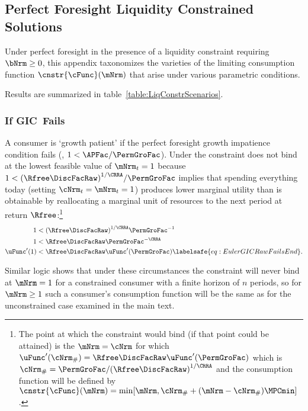 \documentclass[\econtexRoot/BufferStockTheory]{subfiles}
\begin{document}
\subsection{Perfect Foresight Liquidity Constrained Solutions}

Under perfect foresight in the presence of a liquidity constraint requiring $\bNrm \geq 0$, this appendix taxonomizes the varieties of the limiting consumption function $\cnstr{\cFunc}(\mNrm)$ that arise under various parametric conditions.



Results are summarized in table~\ref{table:LiqConstrScenarios}.

\subsubsection{If {GIC}~Fails}

A consumer is `growth patient' if the perfect foresight growth
impatience condition fails (\cncl{\GICRaw}, $1 < \APFac/\PermGroFac$).
Under
\cncl{\GICRaw} the constraint does not bind at the lowest feasible value of $\mNrm_{t}=1$ because
$1 < {(\Rfree\DiscFacRaw)}^{1/\CRRA}/\PermGroFac$ implies that spending
everything today (setting $\cNrm_{t}=\mNrm_{t}=1$) produces lower
marginal utility than is obtainable by reallocating a marginal unit of
resources to the next period at return $\Rfree$:\footnote{The point at
  which the constraint would bind (if that point could be attained) is
  the $\mNrm=\cNrm$ for which $\uFunc^{\prime}(\cNrm_{\#}) = \Rfree
  \DiscFacRaw \uFunc^{\prime}(\PermGroFac)$ which is $\cNrm_{\#} =
  \PermGroFac/{(\Rfree \DiscFacRaw)}^{1/\CRRA}$ and the consumption function
  will be defined by
  $\cnstr{\cFunc}(\mNrm)=\min[\mNrm,\cNrm_{\#}+(\mNrm-\cNrm_{\#})\MPCmin
  ]$.}
\begin{equation}\begin{gathered}\begin{aligned}
  1  & < {(\Rfree \DiscFacRaw)}^{1/\CRRA}\PermGroFac^{-1}    \notag
  \\ 1  & < \Rfree \DiscFacRaw \PermGroFac^{-\CRRA} \notag
  \\  \uFunc^{\prime}(1)  & < \Rfree \DiscFacRaw \uFunc^{\prime}(\PermGroFac)   \labelsafe{eq:EulerGICRawFailsEnd}.
\end{aligned}\end{gathered}\end{equation}

Similar logic shows that under these circumstances the constraint will never bind at $\mNrm=1$ for a constrained consumer with a finite horizon of $n$ periods, so for $\mNrm \geq 1$ such a consumer's consumption function will be the same as for the unconstrained case examined in the main text.
\end{document}
